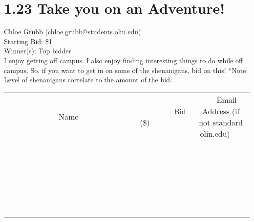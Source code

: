 \documentclass[11pt]{article}
\begin{document}
\section*{1.23 Take you on an Adventure!}
Chloe Grubb (chloe.grubb@students.olin.edu) \\
Starting Bid: \$1 \\
Winner(s): 
Top bidder \\
I enjoy getting off campus. I also enjoy finding interesting things to do while off campus. So, if you want to get in on some of the shenanigans, bid on this! 
*Note: Level of shenanigans correlate to the amount of the bid. \\[6ex]
\begin{tabular}{c c c}
~~~~~~~~~~~~~Name~~~~~~~~~~~~~ & ~~~~~~~~~Bid (\$)~~~~~~~~~ & ~~~Email Address (if not standard olin.edu)~~~ \\
 & & \\
\hline
 & & \\
\hline
 & & \\
\hline
 & & \\
\hline
 & & \\
\hline
 & & \\
\hline
 & & \\
\hline
 & & \\
\hline
 & & \\
\hline
 & & \\
\hline
 & & \\
\hline
 & & \\
\hline
 & & \\
\hline
 & & \\
\hline
 & & \\
\hline
 & & \\
\hline
 & & \\
\hline
 & & \\
\hline
 & & \\
\hline
 & & \\
\hline
 & & \\
\hline
 & & \\
\hline
 & & \\
\hline
 & & \\
\hline
 & & \\
\hline
 & & \\
\hline
\end{tabular}
\clearpage
\end{document}
